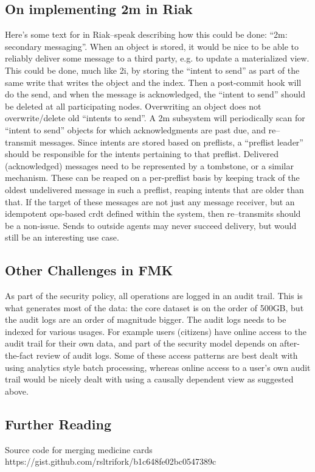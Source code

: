 \documentclass[11pt,a4paper]{report}
\begin{document}
\subsection{On implementing 2m in Riak}
Here's some text for in Riak--speak describing how this could be done: ``2m: secondary messaging''. When an object is stored, it would be nice to be able to reliably deliver some message to a third party, e.g. to update a materialized view.
This could be done, much like 2i, by storing the ``intent to send'' as part of the same write that writes the object and the index. Then a post-commit hook will do the send, and when the message is acknowledged, the ``intent to send'' should be deleted at all participating nodes.
Overwriting an object does not overwrite/delete old ``intents to send''. A 2m subsystem will periodically scan for ``intent to send'' objects for which acknowledgments are past due, and re--transmit messages. Since intents are stored based on preflists, a ``preflist leader'' should be responsible for the intents pertaining to that preflist.
Delivered (acknowledged) messages need to be represented by a tombstone, or a similar mechanism.
These can be reaped on a per-preflist basis by keeping track of the oldest undelivered message in such a preflist, reaping intents that are older than that.
If the target of these messages are not just any message receiver, but an idempotent ops-based \gls{crdt} defined within the system, then re--transmits should be a non-issue. Sends to outside agents may never succeed delivery, but would still be an interesting use case.

\subsection{Other Challenges in FMK}
As part of the security policy, all operations are logged in an audit trail. This is what generates most of the data: the core dataset is on the order of 500GB, but the audit logs are an order of magnitude bigger.
The audit logs needs to be indexed for various usages. For example users (citizens) have online access to the audit trail for their own data, and part of the security model depends on after-the-fact review of audit logs. Some of these access patterns are best dealt with using analytics style batch processing, whereas online access to a user's own audit trail would be nicely dealt with using a causally dependent view as suggested above.

\subsection{Further Reading}
Source code for merging medicine cards
https://gist.github.com/rsltrifork/b1c648fe02bc0547389c
\end{document}
